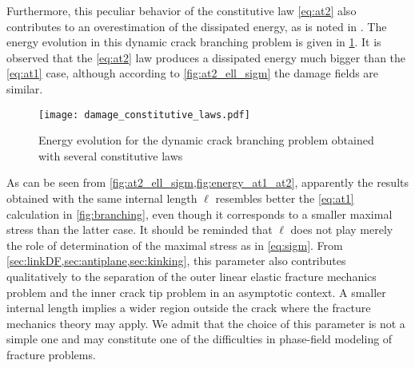 Furthermore, this peculiar behavior of the constitutive law \eqref{eq:at2} also contributes to an overestimation of the dissipated energy, as is noted in \cite{BordenVerhooselScottHughesLandis:2012,VignolletMayBorstVerhoosel:2014}. The energy evolution in this dynamic crack branching problem is given in \cref{fig:energy_at1_at2}. It is observed that the \eqref{eq:at2} law produces a dissipated energy much bigger than the \eqref{eq:at1} case, although according to \cref{fig:at2_ell_sigm} the damage fields are similar.
\begin{figure}[htbp]
\centering
\texttt{[image: damage\_constitutive\_laws.pdf]}
\caption{Energy evolution for the dynamic crack branching problem obtained with several constitutive laws} \label{fig:energy_at1_at2}
\end{figure}

As can be seen from \cref{fig:at2_ell_sigm,fig:energy_at1_at2}, apparently the results obtained with the same internal length $\ell$ resembles better the \eqref{eq:at1} calculation in \cref{fig:branching}, even though it corresponds to a smaller maximal stress than the latter case. It should be reminded that $\ell$ does not play merely the role of determination of the maximal stress as in \eqref{eq:sigm}. From \cref{sec:linkDF,sec:antiplane,sec:kinking}, this parameter also contributes qualitatively to the separation of the outer linear elastic fracture mechanics problem and the inner crack tip problem in an asymptotic context. A smaller internal length implies a wider region outside the crack where the fracture mechanics theory may apply. We admit that the choice of this parameter is not a simple one and may constitute one of the difficulties in phase-field modeling of fracture problems.

